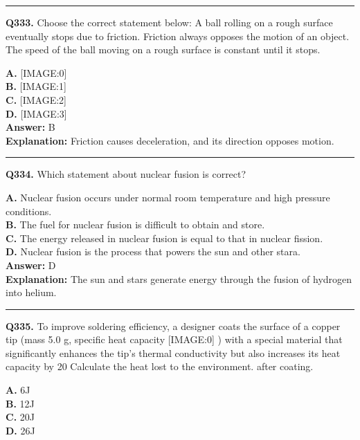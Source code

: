 \documentclass[12pt]{article}
\begin{document}
\hrule
\vspace{1em}


\noindent
\textbf{Q333.} Choose the correct statement below:
A ball rolling on a rough surface eventually stops due to friction.
Friction always opposes the motion of an object.
The speed of the ball moving on a rough surface is constant until it stops.



\textbf{A.} [IMAGE:0] \\
\textbf{B.} [IMAGE:1] \\
\textbf{C.} [IMAGE:2] \\
\textbf{D.} [IMAGE:3] \\

\textbf{Answer:} B \\
\textbf{Explanation:} Friction causes deceleration, and its direction opposes motion.

\hrule
\vspace{1em}


\noindent
\textbf{Q334.} Which statement about nuclear fusion is correct?



\textbf{A.} Nuclear fusion occurs under normal room temperature and high pressure conditions. \\
\textbf{B.} The fuel for nuclear fusion is difficult to obtain and store. \\
\textbf{C.} The energy released in nuclear fusion is equal to that in nuclear fission. \\
\textbf{D.} Nuclear fusion is the process that powers the sun and other stara. \\

\textbf{Answer:} D \\
\textbf{Explanation:} The sun and stars generate energy through the fusion of hydrogen into helium.

\hrule
\vspace{1em}


\noindent
\textbf{Q335.} To improve soldering efficiency, a designer coats the surface of a copper tip (mass 5.0 g, specific heat capacity
[IMAGE:0]
) with a special material that significantly enhances the tip's thermal conductivity but also increases its heat capacity by 20%
Calculate the heat lost to the environment. after coating.



\textbf{A.} 6J \\
\textbf{B.} 12J \\
\textbf{C.} 20J \\
\textbf{D.} 26J \\
\end{document}

